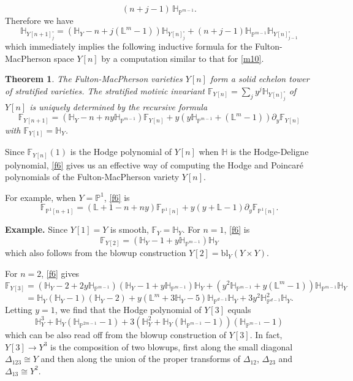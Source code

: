 \documentclass[11pt]{amsart}
\newtheorem{theorem}{Theorem}[section]
\newcommand{\PP}{\mathbb{P}}
\def\LL{\mathbb{L}}
\def\beq{\begin{equation}}
\def\eeq{\end{equation}}
\def\HH{\mathbb{H}}
\def\FF{\mathbb{F}}
\begin{document}
\beq\label{f4'}
(n+j-1)\,\HH_{\PP^{m-1}}.
\eeq
Therefore we have
\beq\label{f5}
\HH_{Y[n+1]_j^\circ}= \left( \HH_Y-n+j(\LL^m-1) \right) \HH_{Y[n]^\circ_j} +
(n+j-1) \HH_{\PP^{m-1}} \HH_{Y[n]^\circ_{j-1}} 
\eeq
which immediately implies 
the following inductive formula for the Fulton-MacPherson space $Y[n]$ by a computation similar to that for \eqref{m10}.
\begin{theorem}\label{f8} The Fulton-MacPherson varieties $Y[n]$ form a solid echelon tower of stratified varieties.  
The stratified motivic invariant 
$\FF_{Y[n]}=\sum_j y^j\HH_{Y[n]_j^\circ}$ of $Y[n]$  is uniquely determined by the recursive formula
\beq\label{f6} 
\FF_{Y[n+1]}=\left(\HH_Y-n+ny\HH_{\PP^{m-1}}\right)\FF_{Y[n]}+ y\left(y\HH_{\PP^{m-1}}+ ({\LL^m}-1)\right)\partial_y\FF_{Y[n]}\eeq
with $\FF_{Y[1]}=\HH_Y$. 
\end{theorem}
Since $\FF_{Y[n]}(1)$ is the Hodge polynomial of ${Y[n]}$ when $\HH$ is the Hodge-Deligne polynomial, \eqref{f6} gives us an effective way of computing the Hodge and Poincar\'e polynomials of the Fulton-MacPherson variety $Y[n]$.

For example, when $Y=\PP^1$, \eqref{f6} is 
\beq\label{f17}
\FF_{\PP^1[n+1]}=(\LL+1-n+ny)\FF_{\PP^1[n]} + y(y+\LL-1)\partial_y\FF_{\PP^1[n]}.\eeq


\medskip

\noindent\textbf{Example.}
Since $Y[1]=Y$ is smooth, $\FF_{Y}=\HH_Y$. 
For $n=1$, \eqref{f6} is 
$$\FF_{Y[2]}=(\HH_Y-1+y\HH_{\PP^{m-1}})\HH_Y$$ which also follows from the blowup construction $Y[2]=\mathrm{bl}_Y(Y\times Y)$. 

For $n=2$, \eqref{f6} gives
$$\FF_{Y[3]}=(\HH_Y-2+2y\HH_{\PP^{m-1}})(\HH_Y-1+y\HH_{\PP^{m-1}})\HH_Y + \left(y^2\HH_{\PP^{m-1}}+ y(\LL^m-1)\right)\HH_{\PP^{m-1}}\HH_Y$$
$$=\HH_Y(\HH_Y-1)(\HH_Y-2)
+y(\LL^m+3\HH_Y-5)\HH_{\PP^{d-1}}\HH_Y
+3y^2\HH_{\PP^{d-1}}^2\HH_Y.$$
Letting $y=1$, we find that the Hodge polynomial of $Y[3]$ equals
$$\HH_Y^3+\HH_Y(\HH_{\PP^{2m-1}}-1)+3(\HH_Y^2+\HH_Y(\HH_{\PP^{m-1}}-1))(\HH_{\PP^{m-1}}-1)$$
which can be also read off from the blowup construction of $Y[3]$. In fact, $Y[3]\to Y^3$ is the composition of two blowups, first along the small diagonal $\Delta_{123}\cong Y$ and then along the union of the proper transforms of $\Delta_{12}$, $\Delta_{23}$ and $\Delta_{13}\cong Y^2$. 
\end{document}
